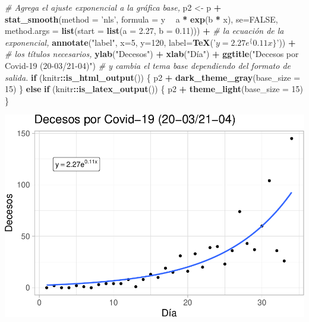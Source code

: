 \documentclass[]{article}
\newenvironment{Shaded}{\begin{snugshade}}{\end{snugshade}}
\newcommand{\CommentTok}[1]{\textcolor[rgb]{0.56,0.35,0.01}{\textit{#1}}}
\newcommand{\ControlFlowTok}[1]{\textcolor[rgb]{0.13,0.29,0.53}{\textbf{#1}}}
\newcommand{\DataTypeTok}[1]{\textcolor[rgb]{0.13,0.29,0.53}{#1}}
\newcommand{\DecValTok}[1]{\textcolor[rgb]{0.00,0.00,0.81}{#1}}
\newcommand{\FloatTok}[1]{\textcolor[rgb]{0.00,0.00,0.81}{#1}}
\newcommand{\KeywordTok}[1]{\textcolor[rgb]{0.13,0.29,0.53}{\textbf{#1}}}
\newcommand{\NormalTok}[1]{#1}
\newcommand{\OperatorTok}[1]{\textcolor[rgb]{0.81,0.36,0.00}{\textbf{#1}}}
\newcommand{\OtherTok}[1]{\textcolor[rgb]{0.56,0.35,0.01}{#1}}
\newcommand{\StringTok}[1]{\textcolor[rgb]{0.31,0.60,0.02}{#1}}
\begin{document}
\begin{Shaded}
\begin{Highlighting}[]
\CommentTok{# Agrega el ajuste exponencial a la gráfica base,}
\NormalTok{p2 <-}\StringTok{ }\NormalTok{p }\OperatorTok{+}
\StringTok{  }\KeywordTok{stat_smooth}\NormalTok{(}\DataTypeTok{method =} \StringTok{'nls'}\NormalTok{, }\DataTypeTok{formula =}\NormalTok{ y }\OperatorTok{~}\StringTok{ }\NormalTok{a }\OperatorTok{*}\StringTok{ }\KeywordTok{exp}\NormalTok{(b }\OperatorTok{*}\StringTok{ }\NormalTok{x), }\DataTypeTok{se=}\OtherTok{FALSE}\NormalTok{,}
              \DataTypeTok{method.args =} \KeywordTok{list}\NormalTok{(}\DataTypeTok{start =} \KeywordTok{list}\NormalTok{(}\DataTypeTok{a =} \FloatTok{2.27}\NormalTok{, }\DataTypeTok{b =}  \FloatTok{0.11}\NormalTok{))) }\OperatorTok{+}
\CommentTok{# la ecuación de la exponencial,}
\StringTok{      }\KeywordTok{annotate}\NormalTok{(}\StringTok{"label"}\NormalTok{, }\DataTypeTok{x=}\DecValTok{5}\NormalTok{, }\DataTypeTok{y=}\DecValTok{120}\NormalTok{, }\DataTypeTok{label=}\KeywordTok{TeX}\NormalTok{(}\StringTok{'$y  =  2.27  e^\{0.11  x \}$'}\NormalTok{)) }\OperatorTok{+}
\CommentTok{# los títulos necesarios,}
\StringTok{  }\KeywordTok{ylab}\NormalTok{(}\StringTok{"Decesos"}\NormalTok{) }\OperatorTok{+}\StringTok{ }\KeywordTok{xlab}\NormalTok{(}\StringTok{"Día"}\NormalTok{) }\OperatorTok{+}\StringTok{  }\KeywordTok{ggtitle}\NormalTok{(}\StringTok{"Decesos por Covid-19 (20-03/21-04)"}\NormalTok{) }
\CommentTok{# y cambia el tema base dependiendo del formato de salida.}
\ControlFlowTok{if}\NormalTok{ (knitr}\OperatorTok{::}\KeywordTok{is_html_output}\NormalTok{()) \{}
\NormalTok{  p2 }\OperatorTok{+}\StringTok{ }\KeywordTok{dark_theme_gray}\NormalTok{(}\DataTypeTok{base_size =} \DecValTok{15}\NormalTok{)}
\NormalTok{\} }\ControlFlowTok{else} \ControlFlowTok{if}\NormalTok{ (knitr}\OperatorTok{::}\KeywordTok{is_latex_output}\NormalTok{()) \{}
\NormalTok{  p2 }\OperatorTok{+}\StringTok{ }\KeywordTok{theme_light}\NormalTok{(}\DataTypeTok{base_size =} \DecValTok{15}\NormalTok{)}
\NormalTok{\}}
\end{Highlighting}
\end{Shaded}

\includegraphics{covid19_mx_files/figure-latex/unnamed-chunk-6-1.pdf}
\end{document}
